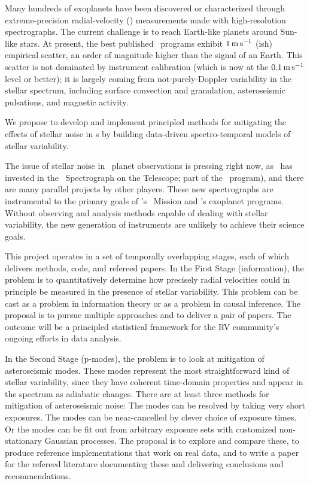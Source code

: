 \documentclass[12pt, fullpage, letterpaper]{article}
\begin{document}
Many hundreds of exoplanets have been discovered or characterized
through extreme-precision radial-velocity (\EPRV) measurements made
with high-resolution spectrographs. The current challenge is to reach
Earth-like planets around Sun-like stars. At present, the best
published \EPRV\ programs exhibit $1\,{\mathrm{m\,s^{-1}}}$ (ish) empirical scatter, an
order of magnitude higher than the signal of an Earth. This scatter is
not dominated by instrument calibration (which is now at the $0.1\,{\mathrm{m\,s^{-1}}}$
level or better); it is largely coming from not-purely-Doppler
variability in the stellar spectrum, including surface convection and
granulation, asteroseismic pulsations, and magnetic activity.

We propose to develop and implement principled methods for mitigating
the effects of stellar noise in \RV s by building data-driven
spectro-temporal models of stellar variability.

The issue of stellar noise in \RV\ planet observations is pressing right
now, as \NASA\ has invested in the \NEID\ Spectrograph on the 
Telescope; part of the \NNEXPLORE\ program), and there are many
parallel projects by other players. These new spectrographs are
instrumental to the primary goals of \NASA's \TESS\ Mission and \NASA's
exoplanet programs. Without observing and analysis methods capable of
dealing with stellar variability, the new generation of instruments
are unlikely to achieve their science goals.

This project operates in a set of temporally overlapping stages, each
of which delivers methods, code, and refereed papers. In the First
Stage (information), the problem is to quantitatively determine how
precisely radial velocities could in principle be measured in the
presence of stellar variability. This problem can be cast as a problem
in information theory or as a problem in causal inference. The
proposal is to pursue multiple approaches and to deliver a pair of
papers. The outcome will be a principled statistical framework for the
RV community’s ongoing efforts in data analysis.

In the Second Stage (p-modes), the problem is to look at mitigation of
asteroseismic modes. These modes represent the most straightforward
kind of stellar variability, since they have coherent time-domain
properties and appear in the spectrum as adiabatic changes. There are
at least three methods for mitigation of asteroseismic noise: The
modes can be resolved by taking very short exposures. The modes can be
near-cancelled by clever choice of exposure times. Or the modes can be
fit out from arbitrary exposure sets with customized non-stationary
Gaussian processes. The proposal is to explore and compare these, to
produce reference implementations that work on real data, and to write
a paper for the refereed literature documenting these and delivering
conclusions and recommendations.
\end{document}
